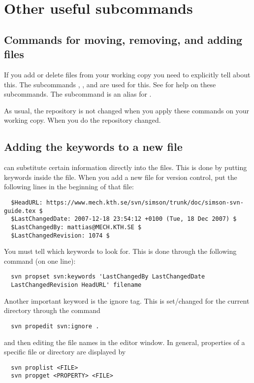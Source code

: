 \documentclass[10pt,a4paper]{simson}
\begin{document}
\section{Other useful subcommands}

\subsection{Commands for moving, removing, and adding files}
If you add or delete files from your working copy you need to
explicitly tell  about this. The subcommands
, ,  and 
are used for this. See  for help on these
subcommands. The  subcommand is an alias for
.

As usual, the repository is not changed when you apply these commands
on your working copy. When you do  the repository
changed.


\subsection{Adding the keywords to a new file}
 can substitute certain information directly into
the files. This is done by putting keywords inside the file. When you
add a new file for version control, put the following lines in the
beginning of that file:
\begin{verbatim}
  $HeadURL: https://www.mech.kth.se/svn/simson/trunk/doc/simson-svn-guide.tex $
  $LastChangedDate: 2007-12-18 23:54:12 +0100 (Tue, 18 Dec 2007) $
  $LastChangedBy: mattias@MECH.KTH.SE $
  $LastChangedRevision: 1074 $
\end{verbatim}
You must tell  which keywords to look for. This is
done through the following command (on one line):
\begin{verbatim}
  svn propset svn:keywords 'LastChangedBy LastChangedDate
  LastChangedRevision HeadURL' filename
\end{verbatim}
Another important keyword is the ignore tag. This is set/changed for
the current directory through the command
\begin{verbatim}
  svn propedit svn:ignore .
\end{verbatim}
and then editing the file names in the editor window. In general,
properties of a specific file or directory are displayed by
\begin{verbatim}
  svn proplist <FILE>
  svn propget <PROPERTY> <FILE>
\end{verbatim}
\end{document}
